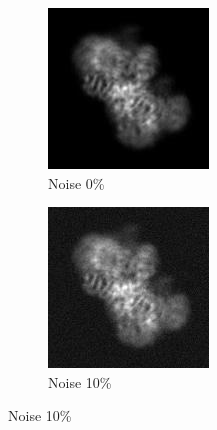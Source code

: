 \documentclass{report}
\begin{document}
\begin{figure}[h]
\centering

\begin{subfigure}{.3\textwidth}
\centering
\includegraphics[width=0.8\linewidth]{Emd_4138_proj_1.jpg}
\captionsetup{justification=centering}
\caption{ Noise 0\% }
\end{subfigure} 
\begin{subfigure}{.27\textwidth}
\centering
\includegraphics[width=0.8\linewidth]{Emd_4138_proj1_noise_10.jpg}
\captionsetup{justification=centering}
\caption{ Noise 10\%}
\end{subfigure}

\end{figure}
\end{document}
